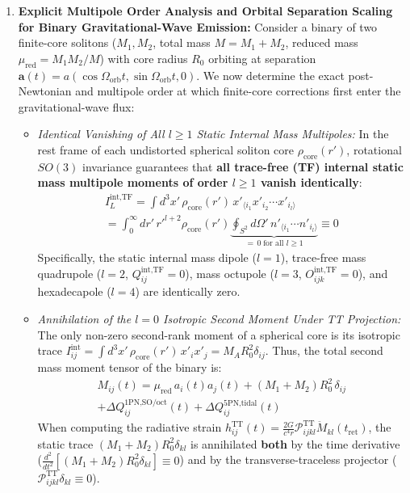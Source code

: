 \documentclass[10pt,aps,prd,twocolumn,superscriptaddress,nofootinbib,floatfix,longbibliography,showkeys]{revtex4-2}
\begin{document}
\begin{enumerate}
\begin{itemize}
  \end{itemize}
  \item \textbf{Explicit Multipole Order Analysis and Orbital Separation Scaling for Binary Gravitational-Wave Emission:} Consider a binary of two finite-core solitons ($M_1, M_2$, total mass $M = M_1 + M_2$, reduced mass $\mu_{\text{red}} = M_1 M_2 / M$) with core radius $R_0$ orbiting at separation $\mathbf{a}(t) = a(\cos\Omega_{\text{orb}} t, \sin\Omega_{\text{orb}} t, 0)$. We now determine the exact post-Newtonian and multipole order at which finite-core corrections first enter the gravitational-wave flux:
  \begin{itemize}
    \item \textit{Identical Vanishing of All $l \ge 1$ Static Internal Mass Multipoles:} In the rest frame of each undistorted spherical soliton core $\rho_{\text{core}}(r')$, rotational $SO(3)$ invariance guarantees that \textbf{all trace-free (TF) internal static mass multipole moments of order $l \ge 1$ vanish identically}:
\begin{multline}
I_{L}^{\text{int,TF}} = \int d^3x'\,\rho_{\text{core}}(r')\,x'_{\langle i_1} x'_{i_2} \cdots x'_{i_l\rangle} \\
= \int_0^\infty dr'\,r'^{l+2}\rho_{\text{core}}(r') \underbrace{\oint_{S^2} d\Omega'\,n'_{\langle i_1}\cdots n'_{i_l\rangle}}_{=\,0\;\text{for all }l \ge 1} \equiv 0
\end{multline}
  Specifically, the static internal mass dipole ($l=1$), trace-free mass quadrupole ($l=2$, $Q_{ij}^{\text{int,TF}} = 0$), mass octupole ($l=3$, $O_{ijk}^{\text{int,TF}} = 0$), and hexadecapole ($l=4$) are identically zero.
    \item \textit{Annihilation of the $l=0$ Isotropic Second Moment Under TT Projection:} The only non-zero second-rank moment of a spherical core is its isotropic trace $I_{ij}^{\text{int}} = \int d^3x'\,\rho_{\text{core}}(r')\,x'_i x'_j = M_A R_0^2 \delta_{ij}$. Thus, the total second mass moment tensor of the binary is:
\begin{multline}
M_{ij}(t) = \mu_{\text{red}}\,a_i(t) a_j(t) + (M_1 + M_2) R_0^2\,\delta_{ij} \\
+ \Delta Q_{ij}^{\text{1PN,SO/oct}}(t) + \Delta Q_{ij}^{\text{5PN,tidal}}(t)
\end{multline}
  When computing the radiative strain $h_{ij}^{\text{TT}}(t) = \frac{2G}{c^4 r}\mathcal{P}_{ijkl}^{\text{TT}}\ddot{M}_{kl}(t_{\text{ret}})$, the static trace $(M_1 + M_2)R_0^2\delta_{kl}$ is annihilated \textbf{both} by the time derivative ($\frac{d^2}{dt^2}[(M_1+M_2)R_0^2\delta_{kl}] \equiv 0$) and by the transverse-traceless projector ($\mathcal{P}_{ijkl}^{\text{TT}}\delta_{kl} \equiv 0$).

\end{itemize}
\end{enumerate}
\end{document}
